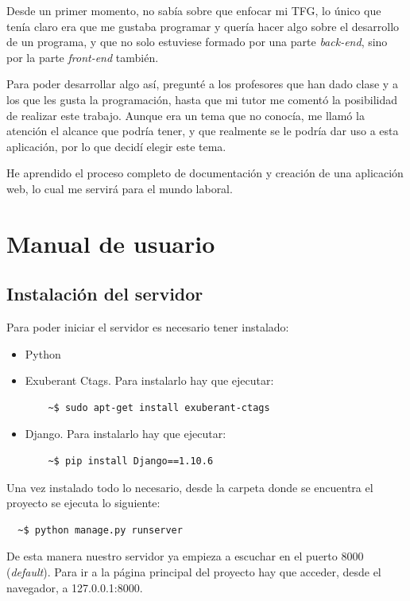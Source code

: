 \documentclass[a4paper, 12pt]{book}
\begin{document}
Desde un primer momento, no sabía sobre que enfocar mi TFG, lo único que tenía claro era que me gustaba programar y
quería hacer algo sobre el desarrollo de un programa, y que no solo estuviese formado por una parte \emph{back-end}, sino por la parte \emph{front-end} también.

Para poder desarrollar algo así, pregunté a los profesores que han dado clase y a los que les gusta la programación, hasta que mi tutor me comentó la posibilidad de realizar
este trabajo. Aunque era un tema que no conocía, me llamó la atención el alcance que podría tener, y que realmente se le podría dar
uso a esta aplicación, por lo que decidí elegir este tema.

He aprendido el proceso completo de documentación y creación de una aplicación web, lo cual me servirá para el mundo laboral.



\cleardoublepage
\appendix
\chapter{Manual de usuario}
\label{app:manual}

\section{Instalación del servidor}
\label{sec:inst_server}
Para poder iniciar el servidor es necesario tener instalado:

\begin{itemize}
  \item Python
  \item Exuberant Ctags. Para instalarlo hay que ejecutar:
  \begin{lstlisting}
    ~$ sudo apt-get install exuberant-ctags
  \end{lstlisting}
  \item Django. Para instalarlo hay que ejecutar:
  \begin{lstlisting}
    ~$ pip install Django==1.10.6
  \end{lstlisting}
\end{itemize}

Una vez instalado todo lo necesario, desde la carpeta donde se encuentra el proyecto se ejecuta lo siguiente:
\begin{lstlisting}
  ~$ python manage.py runserver
\end{lstlisting}
De esta manera nuestro servidor ya empieza a escuchar en el puerto 8000 (\emph{default}). Para ir a la página principal del proyecto hay que acceder, desde el navegador, a 127.0.0.1:8000.
\end{document}

